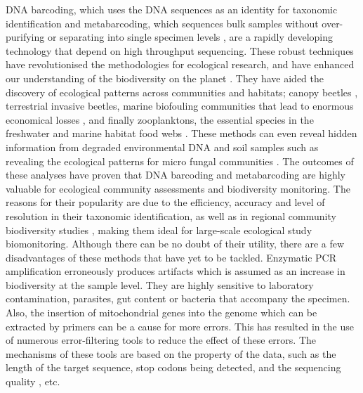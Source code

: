 \documentclass[11pt, a4paper]{article}
\begin{document}
DNA barcoding, which uses the DNA sequences as an identity for taxonomic identification \cite{Hebert2003} and metabarcoding, which sequences bulk samples without over-purifying or separating into single specimen levels \cite{tablert2012} , are a rapidly developing technology that depend on high throughput sequencing. These robust techniques have revolutionised the methodologies for ecological research, and have enhanced our understanding of the biodiversity on the planet \cite{hamilton2010}. They have aided the discovery of ecological patterns across communities and habitats; canopy beetles \cite{Creedy2019}, terrestrial invasive beetles\cite{Hardulak2020}, marine biofouling communities that lead to enormous economical losses \cite{Azevedo2020}, and finally zooplanktons, the essential species in the freshwater and marine habitat food webs \cite{Chain2016}. These methods can even reveal hidden information from degraded environmental DNA and soil samples \cite{Carraro2020} such as revealing the ecological patterns for micro fungal communities \cite{Schmidt2013}. The outcomes of these analyses have proven that DNA barcoding and metabarcoding are highly valuable for ecological community assessments and biodiversity monitoring\cite{Elbrecht2017}. The reasons for their popularity are due to the efficiency, accuracy and level of resolution in their taxonomic identification, as well as in regional community biodiversity studies \cite{Hajibabaei2007}, making them ideal for large-scale ecological study biomonitoring.
Although there can be no doubt of their utility, there are a few disadvantages of these methods that have yet to be tackled. Enzymatic PCR amplification erroneously produces artifacts which is assumed as an increase in biodiversity at the sample level\cite{Patin2013}. They are highly sensitive to laboratory contamination, parasites, gut content or bacteria that accompany the specimen\cite{Alberdi2020}. Also, the insertion of mitochondrial genes into the genome which can be extracted by primers can be a cause for more errors\cite{Lopez1994}. This has resulted in the use of numerous error-filtering tools to reduce the effect of these errors. The mechanisms of these tools are based on the property of the data, such as the length of the target sequence, stop codons being detected, and the sequencing quality \cite{Cock2009}, etc. 
\end{document}
